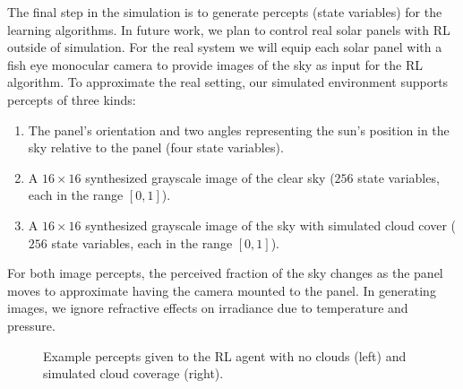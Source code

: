 \documentclass{article}
\begin{document}
The final step in the simulation is to generate percepts (state variables) for the learning algorithms. In future work, we plan to control real solar panels with RL outside of simulation. For the real system we will equip each solar panel with a fish eye monocular camera to provide images of the sky as input for the RL algorithm. To approximate the real setting, our simulated environment supports percepts of three kinds:
\begin{enumerate}
\item The panel's orientation and two angles representing the sun's position in the sky relative to the panel (four state variables).
\item A $16 \times 16$ synthesized grayscale image of the clear sky ($256$ state variables, each in the range $[0,1]$).
\item A $16\times 16$ synthesized grayscale image of the sky with simulated cloud cover ($256$ state variables, each in the range $[0,1]$).
\end{enumerate}
For both image percepts, the perceived fraction of the sky changes as the panel moves to approximate having the camera mounted to the panel. In generating images, we ignore refractive effects on irradiance due to temperature and pressure.

\begin{figure}[t]
\begin{center}
 \hspace{16mm} %
\caption{Example percepts given to the RL agent with no clouds (left) and simulated cloud coverage (right).}
\end{center}
\end{figure}
\end{document}
